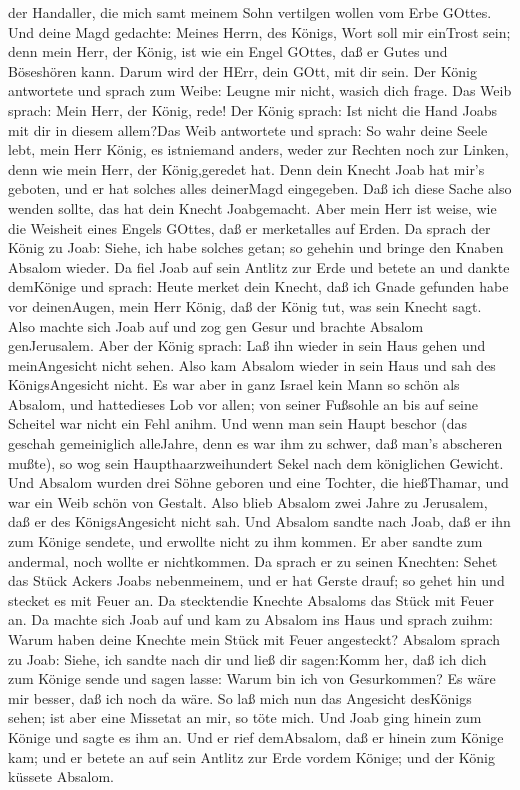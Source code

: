 der Handaller, die mich samt meinem Sohn vertilgen wollen vom Erbe
GOttes.  Und deine Magd gedachte: Meines Herrn, des Königs,
Wort soll mir einTrost sein; denn mein Herr, der König, ist wie ein
Engel GOttes, daß er Gutes und Böseshören kann. Darum wird der HErr,
dein GOtt, mit dir sein.  Der König antwortete und sprach
zum Weibe: Leugne mir nicht, wasich dich frage. Das Weib sprach: Mein
Herr, der König, rede!  Der König sprach: Ist nicht die
Hand Joabs mit dir in diesem allem?Das Weib antwortete und sprach: So
wahr deine Seele lebt, mein Herr König, es istniemand anders, weder zur
Rechten noch zur Linken, denn wie mein Herr, der König,geredet hat. Denn
dein Knecht Joab hat mir's geboten, und er hat solches alles deinerMagd
eingegeben.  Daß ich diese Sache also wenden sollte, das
hat dein Knecht Joabgemacht. Aber mein Herr ist weise, wie die Weisheit
eines Engels GOttes, daß er merketalles auf Erden.  Da
sprach der König zu Joab: Siehe, ich habe solches getan; so gehehin und
bringe den Knaben Absalom wieder.  Da fiel Joab auf sein
Antlitz zur Erde und betete an und dankte demKönige und sprach: Heute
merket dein Knecht, daß ich Gnade gefunden habe vor deinenAugen, mein
Herr König, daß der König tut, was sein Knecht sagt.  Also
machte sich Joab auf und zog gen Gesur und brachte Absalom genJerusalem.
 Aber der König sprach: Laß ihn wieder in sein Haus gehen
und meinAngesicht nicht sehen. Also kam Absalom wieder in sein Haus und
sah des KönigsAngesicht nicht.  Es war aber in ganz Israel
kein Mann so schön als Absalom, und hattedieses Lob vor allen; von
seiner Fußsohle an bis auf seine Scheitel war nicht ein Fehl anihm.
 Und wenn man sein Haupt beschor (das geschah gemeiniglich
alleJahre, denn es war ihm zu schwer, daß man's abscheren mußte), so wog
sein Haupthaarzweihundert Sekel nach dem königlichen Gewicht.
 Und Absalom wurden drei Söhne geboren und eine Tochter,
die hießThamar, und war ein Weib schön von Gestalt.  Also
blieb Absalom zwei Jahre zu Jerusalem, daß er des KönigsAngesicht nicht
sah.  Und Absalom sandte nach Joab, daß er ihn zum Könige
sendete, und erwollte nicht zu ihm kommen. Er aber sandte zum andermal,
noch wollte er nichtkommen.  Da sprach er zu seinen
Knechten: Sehet das Stück Ackers Joabs nebenmeinem, und er hat Gerste
drauf; so gehet hin und stecket es mit Feuer an. Da stecktendie Knechte
Absaloms das Stück mit Feuer an.  Da machte sich Joab auf
und kam zu Absalom ins Haus und sprach zuihm: Warum haben deine Knechte
mein Stück mit Feuer angesteckt?  Absalom sprach zu Joab:
Siehe, ich sandte nach dir und ließ dir sagen:Komm her, daß ich dich zum
Könige sende und sagen lasse: Warum bin ich von Gesurkommen? Es wäre mir
besser, daß ich noch da wäre. So laß mich nun das Angesicht desKönigs
sehen; ist aber eine Missetat an mir, so töte mich.  Und
Joab ging hinein zum Könige und sagte es ihm an. Und er rief demAbsalom,
daß er hinein zum Könige kam; und er betete an auf sein Antlitz zur Erde
vordem Könige; und der König küssete Absalom.


